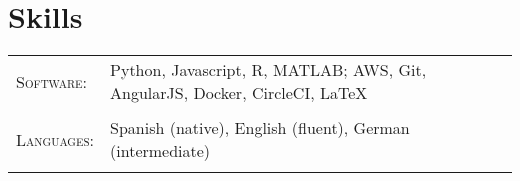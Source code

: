 \documentclass[a4paper,10pt]{article}
\begin{document}
\begin{tabularx}{\textwidth}{Xr}

\end{tabularx}








\section{Skills}
\begin{tabularx}{\textwidth}{lX}
\textsc{Software:}& Python, Javascript, R, MATLAB; AWS, Git, AngularJS, Docker, CircleCI, \LaTeX \\ \\ 
 \textsc{Languages:}& Spanish (native), English (fluent), German (intermediate)\\ \\ 
\end{tabularx}

\end{document}
